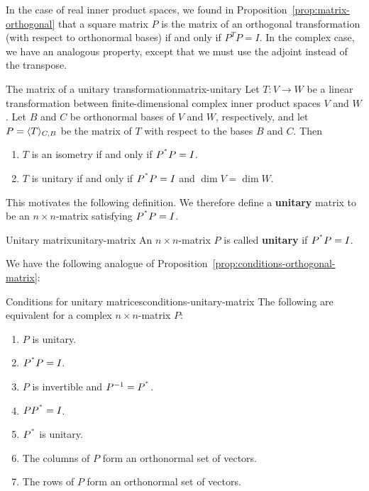 \documentclass{ximera}
\begin{document}
In the case of real inner product spaces, we found in
Proposition~\ref{prop:matrix-orthogonal} that a square matrix $P$ is
the matrix of an orthogonal transformation (with respect to
orthonormal bases) if and only if $P^TP=I$. In the complex case, we
have an analogous property, except that we must use the adjoint
instead of the transpose.

\begin{proposition}{The matrix of a unitary transformation}{matrix-unitary}
  Let $T:V\to W$ be a linear transformation between finite-dimensional
  complex inner product spaces $V$ and $W$. Let $B$ and $C$ be
  orthonormal bases of $V$ and $W$, respectively, and let
  $P=\langle T\rangle_{C,B}$ be the matrix of $T$ with respect to the bases
  $B$ and $C$. Then

    \begin{enumerate}
    \item $T$ is an isometry if and only if $P^{^{*}}P = I$.
    \item $T$ is unitary if and only if $P^{^{*}}P = I$ and
      $\dim V=\dim W$.
    \end{enumerate}

\end{proposition}

This motivates the following definition.  We therefore define a
\textbf{unitary}%
 matrix to be an $n\times n$-matrix satisfying
$P^{^{*}}P=I$.

\begin{definition}{Unitary matrix}{unitary-matrix}
  An $n\times n$-matrix $P$ is called \textbf{unitary}%
   if $P^{^{*}}P=I$.
\end{definition}

We have the following analogue of
Proposition~\ref{prop:conditions-orthogonal-matrix}:

\begin{proposition}{Conditions for unitary matrices}{conditions-unitary-matrix}
  The following are equivalent for a complex $n\times n$-matrix $P$:

    \begin{enumerate}
    \item $P$ is unitary.
    \item $P^{^{*}}P=I$.
    \item $P$ is invertible and $P^{-1}=P^{^{*}}$.
    \item $PP^{^{*}}=I$.
    \item $P^{^{*}}$ is unitary.
    \item The columns of $P$ form an orthonormal set of vectors.
    \item The rows of $P$ form an orthonormal set of vectors.
    \end{enumerate}

\end{proposition}
\end{document}
